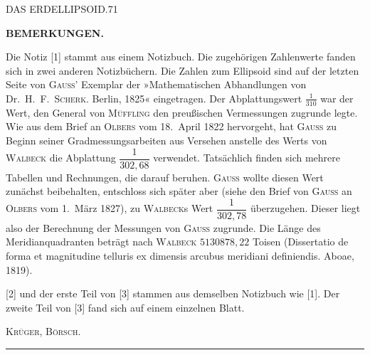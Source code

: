 \clearpage
\noindent\mbox{}\hfill DAS ERDELLIPSOID.\hfill 71\par
\vspace{12mm}
\begin{center}\textbf{BEMERKUNGEN.}\end{center}
{\small
Die Notiz [1] stammt aus einem Notizbuch. Die zugehörigen Zahlenwerte fanden sich in zwei
anderen Notizbüchern. Die Zahlen zum Ellipsoid sind auf der letzten Seite von \textsc{Gauss}' Exemplar
der »Mathematischen Abhandlungen von Dr.\ H.\ F.\ \textsc{Scherk}. Berlin, 1825« eingetragen.
Der Abplattungswert $\tfrac1{310}$ war der Wert, den General von \textsc{Müffling} den preußischen
Vermessungen zugrunde legte. Wie aus dem Brief an \textsc{Olbers} vom 18.\ April 1822 hervorgeht,
hat \textsc{Gauss} zu Beginn seiner Gradmessungsarbeiten aus Versehen anstelle des Werts von
\textsc{Walbeck} die Abplattung $\dfrac1{302{,}68}$ verwendet. Tatsächlich finden sich mehrere
Tabellen und Rechnungen, die darauf beruhen. \textsc{Gauss} wollte diesen Wert zunächst
beibehalten, entschloss sich später aber (siehe den Brief von \textsc{Gauss} an \textsc{Olbers}
vom 1.\ März 1827), zu \textsc{Walbeck}s Wert $\dfrac1{302{,}78}$ überzugehen. Dieser liegt
also der Berechnung der Messungen von \textsc{Gauss} zugrunde. Die Länge des Meridianquadranten
beträgt nach \textsc{Walbeck} $5130878{,}22$ Toisen (Dissertatio de forma et magnitudine telluris
ex dimensis arcubus meridiani definiendis. Aboae, 1819).

[2] und der erste Teil von [3] stammen aus demselben Notizbuch wie [1]. Der zweite Teil von
[3] fand sich auf einem einzelnen Blatt.
\par\hfill\textsc{Krüger, Börsch.}\par
}
\begin{center}\rule{.25\textwidth}{.4pt}\end{center}
